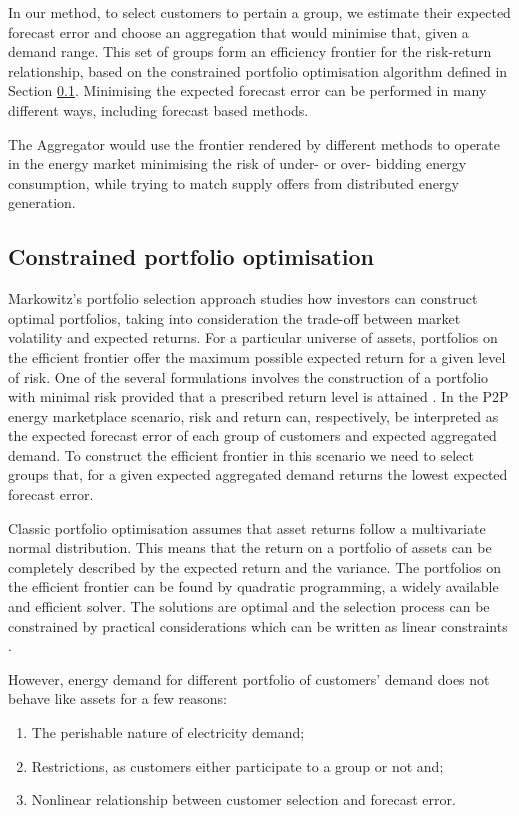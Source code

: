 \documentclass[preprint,3p,11pt,authoryear]{elsarticle}
\begin{document}
In our method, to select customers to pertain a group, we estimate their expected forecast error and choose an aggregation that would minimise that, given a demand range.
This set of groups form an efficiency frontier for the risk-return relationship, based on the constrained portfolio optimisation algorithm defined in Section \ref{ss:sdevgrp}.
Minimising the expected forecast error can be performed in many different ways, including forecast based methods.

The Aggregator would use the frontier rendered by different methods to operate in the energy market minimising the risk of under- or over- bidding energy consumption, while trying to match supply offers from distributed energy generation.

\subsection{Constrained portfolio optimisation}
\label{ss:sdevgrp}
Markowitz’s portfolio selection approach studies how investors can construct optimal portfolios, taking into consideration the trade-off between market volatility and expected returns.
For a particular universe of assets, portfolios on the efficient frontier offer the maximum possible expected return for a given level of risk.
One of the several formulations involves the construction of a portfolio with minimal risk provided that a prescribed return level is attained \citep{bonami2009portopt}.
In the P2P energy marketplace scenario, risk and return can, respectively, be interpreted as the expected forecast error of each group of customers and expected aggregated demand.
To construct the efficient frontier in this scenario we need to select groups that, for a given expected aggregated demand returns the lowest expected forecast error.

Classic portfolio optimisation assumes that asset returns follow a multivariate normal distribution.
This means that the return on a portfolio of assets can be completely described by the expected return and the variance.
The portfolios on the efficient frontier can be found by quadratic programming, a widely available and efficient solver.
The solutions are optimal and the selection process can be constrained by practical considerations which can be written as linear constraints \citep{CHANG20001271}.

However, energy demand for different portfolio of customers' demand does not behave like assets for a few reasons:
\begin{enumerate}
   \item The perishable nature of electricity demand;
   \item Restrictions, as customers either participate to a group or not and;
   \item Nonlinear relationship between customer selection and forecast error.
\end{enumerate}
\end{document}
